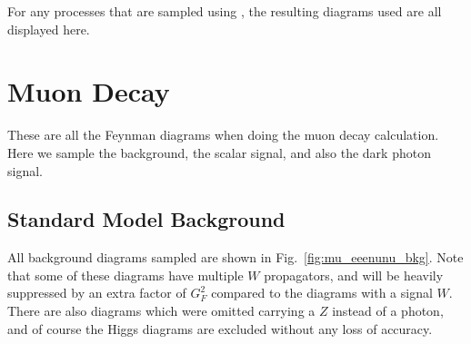 \label{chapter:feynman_diagrams_appendix}
For any processes that are sampled using \madgraph, the resulting diagrams used are all displayed here.

\section{Muon Decay}
These are all the Feynman diagrams when doing the muon decay calculation.
Here we sample the background, the scalar signal, and also the dark photon signal.

\subsection{Standard Model Background}
All background diagrams sampled are shown in Fig.\ \ref{fig:mu_eeenunu_bkg}. 
Note that some of these diagrams have multiple $W$ propagators, and will be heavily suppressed by an extra factor of $G_F^2$ compared to the diagrams with a signal $W$.
There are also diagrams which were omitted carrying a $Z$ instead of a photon, and of course the Higgs diagrams are excluded without any loss of accuracy.

